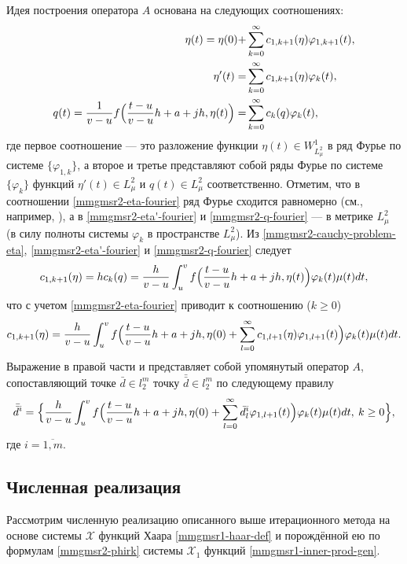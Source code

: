 Идея построения оператора $A$ основана на следующих соотношениях:
\begin{align}
\label{mmgmsr2-eta-fourier}
\eta(t) = \eta(0)+ &\sum_{k=0}^\infty c_{1,k+1}(\eta) \varphi_{1,k+1}(t),\\
\label{mmgmsr2-eta'-fourier}
\eta'(t) =  &\sum_{k=0}^\infty c_{1,k+1}(\eta)\varphi_k(t),\\
\label{mmgmsr2-q-fourier}
q(t)=
\frac{1}{v-u}f\Bigl(\frac{t-u}{v-u}h+a+jh,\eta(t)\Bigr)
= &\sum_{k=0}^\infty c_{k}(q)\varphi_k(t),
\end{align}
где первое соотношение --- это разложение функции $\eta(t) \in W^1_{L^2_\mu}$ в ряд Фурье по системе $\{\varphi_{1,k}\}$, а второе и третье представляют собой ряды Фурье по системе $\{\varphi_{k}\}$ функций $\eta'(t) \in L^2_\mu$ и $q(t) \in L^2_\mu$ соответственно.
Отметим, что в соотношении \eqref{mmgmsr2-eta-fourier} ряд Фурье сходится равномерно (см., например, \cite[теорема 2]{mmgmsr2-SHII-MMG-Demi2015}), а в \eqref{mmgmsr2-eta'-fourier} и \eqref{mmgmsr2-q-fourier} --- в метрике $L^2_\mu$ (в силу полноты системы $\varphi_{k}$ в пространстве $L^2_\mu$). Из \eqref{mmgmsr2-cauchy-problem-eta}, \eqref{mmgmsr2-eta'-fourier} и \eqref{mmgmsr2-q-fourier} следует
\begin{equation*}
c_{1,k+1}(\eta)=hc_k(q)=
\frac{h}{v-u}
\int_{u}^{v}
f\Bigl(\frac{t-u}{v-u}h+a+jh,\eta(t)\Bigr)
\varphi_k(t)\mu(t)dt,
\end{equation*}
что с учетом \eqref{mmgmsr2-eta-fourier} приводит к соотношению ($k \ge 0$)
\begin{equation*}
c_{1,k+1}(\eta)=
\frac{h}{v-u}\int_{u}^{v}f\Bigl(\frac{t-u}{v-u}h+a+jh,\eta(0)+ \sum_{l=0}^\infty c_{1,l+1}(\eta) \varphi_{1,l+1}(t)\Bigr)\varphi_k(t)\mu(t)dt.
\end{equation*}
Выражение в правой части и представляет собой упомянутый оператор $A$, сопоставляющий точке $\bar{d} \in l^m_2$ точку $\bar{\bar{d}} \in l^m_2$ по следующему правилу
\begin{equation*}
\bar{\bar{d}}^i=
\Bigl\{
\frac{h}{v-u}\int_{u}^{v}f\Bigl(\frac{t-u}{v-u}h+a+jh,\eta(0)+
\sum_{l=0}^\infty \bar{d}^i_l \varphi_{1,l+1}(t)\Bigr)\varphi_k(t)\mu(t)dt,
\: k \ge 0
\Bigr\},
\end{equation*}
где $i=\overline{1,m}$.

\subsection{Численная реализация}
Рассмотрим численную реализацию описанного выше итерационного метода на основе системы $\mathcal{X}$ функций Хаара \eqref{mmgmsr1-haar-def} и порождённой ею по формулам \eqref{mmgmsr2-phirk} системы $\mathcal{X}_1$ функций \eqref{mmgmsr1-inner-prod-gen}.

